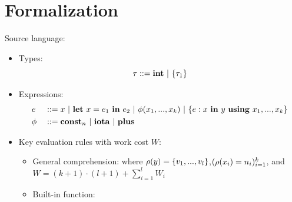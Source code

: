 \documentclass{beamer}
\begin{document}
\section{Formalization}

\begin{frame}{Source language: {\fmsnesl}}
\begin{itemize}
	\item Types: $$\tau ::= \int \ | \ \tseq{\tau_1}$$
 	\item Expressions: 
 	\begin{alignat*}{2}
 	& e &&::=  x \ | \ \Let{x}{e_1}{e_2} \ | \ \hcall{\Tupk{x}} \ | \ \Comp{e}{x}{y}{\usevarsk} \\
 	& \hcall && ::= \*{const}_n \ | \ \*{iota} \ | \ \*{plus} 
 	\end{alignat*}
 	\item Key evaluation rules with work cost $W$:
 	\begin{itemize}
 	
 	\item General comprehension: 
  where $\rho(y)=\{\replc{l}{v}\}$,$\k{\rho(x_i) = n_i}$, and $W =  (k+1)\cdot (l+1) \!+\!\sum_{i=1}^{l}W_i $ \\[2ex]
  
   \item Built-in function: 
	\end{itemize}
\end{itemize}
\end{frame}
\end{document}
